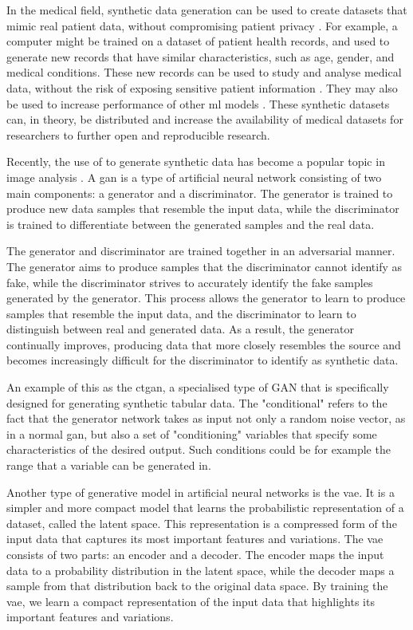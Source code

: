 \documentclass[12pt, a4paper]{article}
\begin{document}
In the medical field, synthetic data generation can be used to create datasets that mimic real patient data, without
compromising patient privacy \cite{liu_ppgan_2019}. For example, a computer might be trained on a dataset of patient
health records, and used to generate new records that have similar characteristics, such as age, gender, and medical
conditions. These new records can be used to study and analyse medical data, without the risk of exposing sensitive
patient information \cite{liu_ppgan_2019}. They may also be used to increase performance of other \acrshort{ml} models
\cite{chen_synthetic_2021}. These synthetic datasets can, in theory, be distributed and increase the availability of
medical datasets for researchers to further open and reproducible research.

Recently, the use of  to generate synthetic data has become a popular topic in image analysis
\cite{pavan_kumar_generative_2021}. A \acrshort{gan} is a type of artificial neural network consisting of two main
components: a generator and a discriminator. The generator is trained to produce new data samples that resemble the
input data, while the discriminator is trained to differentiate between the generated samples and the real data.
\cite{pavan_kumar_generative_2021}

The generator and discriminator are trained together in an adversarial manner. The generator aims to produce samples
that the discriminator cannot identify as fake, while the discriminator strives to accurately identify the fake samples
generated by the generator. This process allows the generator to learn to produce samples that resemble the input data,
and the discriminator to learn to distinguish between real and generated data. As a result, the generator continually
improves, producing data that more closely resembles the source and becomes increasingly difficult for the
discriminator to identify as synthetic data. \cite{pavan_kumar_generative_2021}

An example of this as the \acrfull{ctgan}, a specialised type of GAN that is specifically designed for generating
synthetic tabular data. The "conditional" refers to the fact that the generator network takes as input not only a
random noise vector, as in a normal \acrshort{gan}, but also a set of "conditioning" variables that specify some
characteristics of the desired output. Such conditions could be for example the range that a variable can be generated
in. \cite{xu_modeling_2019}

Another type of generative model in artificial neural networks is the \acrfull{vae}. It is a simpler and more compact
model that learns the probabilistic representation of a dataset, called the latent space. This representation is a
compressed form of the input data that captures its most important features and variations. The \acrshort{vae} consists
of two parts: an encoder and a decoder. The encoder maps the input data to a probability distribution in the latent
space, while the decoder maps a sample from that distribution back to the original data space. By training the
\acrshort{vae}, we learn a compact representation of the input data that highlights its important features and
variations. \cite{kingma_auto-encoding_2013}
\end{document}
